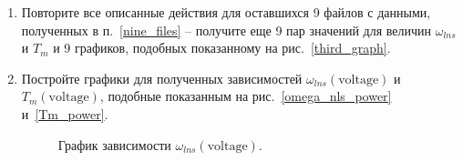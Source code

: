 \documentclass[12pt,a4paper,openany]{extarticle}
\begin{document}
\begin{enumerate}
\begin{enumerate}
Прежде, чем сохранять и экспортировать график в картинку, пройдите по вкладке <<Правка>>, выберете пункт <<Свойства графического окна...>> и в появившемся окне отредактируйте свойства графиков, осей и графического окна такие, как цвет, подписи к осям и~т.д. 
Пример конечного результата см.~рис.~\ref{third_graph}. Имеющаяся на нем легенда строится командой \verb|legend()|, в качестве аргументов которой следует указать названия графиков в порядке их построения и <<номер>> угла, в которой ее следует разместить. Например, показанная на рис.~\ref{third_graph} легенда была построена командой \verb|legend('Experiment','$\theta(t)=\omega_{nls}t-\omega_{nls}T_m+|\\
\verb|\omega_{nls}T_m\,exp\bigl(-\frac{t}{T_m}\bigr)$','Model',2)|\footnote{Как видно из этой строки, чтобы применять в надписях, встречающихся в среде Scilab, команды языка \TeX\, и макропакета \LaTeX, их надо ограждать символами \$.}
\end{enumerate}
\item Повторите все описанные действия для оставшихся 9 файлов с данными, полученных в п.~\ref{nine_files} -- получите еще 9 пар значений для величин $\omega_{lns}$ и $T_m$ и 9 графиков, подобных показанному на рис.~\ref{third_graph}.
\item Постройте графики для полученных зависимостей $\omega_{lns}(\mathrm{voltage})$ и $T_m(\mathrm{voltage})$, подобные показанным на рис.~\ref{omega_nls_power} и~\ref{Tm_power}.
\begin{figure}[h!]
	\noindent{}
	\caption{График зависимости $\omega_{lns}(\mathrm{voltage})$.}

\end{figure}
\end{enumerate}
\end{document}
